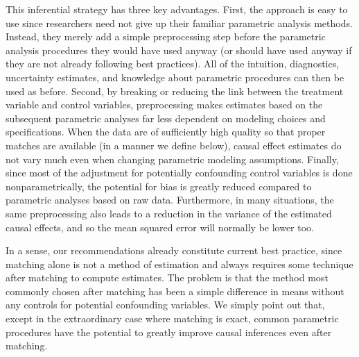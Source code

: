 \documentclass[11pt,titlepage]{article}
\begin{document}
This inferential strategy has three key advantages.  First, the
approach is easy to use since researchers need not give up their
familiar parametric analysis methods.  Instead, they merely add a
simple preprocessing step before the parametric analysis procedures
they would have used anyway (or should have used anyway if they are
not already following best practices).  All of the intuition,
diagnostics, uncertainty estimates, and knowledge about parametric
procedures can then be used as before.  Second, by breaking or
reducing the link between the treatment variable and control
variables, preprocessing makes estimates based on the subsequent
parametric analyses far less dependent on modeling choices and
specifications.  When the data are of sufficiently high quality so
that proper matches are available (in a manner we define below),
causal effect estimates do not vary much even when changing parametric
modeling assumptions.  Finally, since most of the adjustment for
potentially confounding control variables is done nonparametrically,
the potential for bias is greatly reduced compared to parametric
analyses based on raw data.  Furthermore, in many situations, the same
preprocessing also leads to a reduction in the variance of the
estimated causal effects, and so the mean squared error will normally
be lower too.

In a sense, our recommendations already constitute current best
practice, since matching alone is not a method of estimation and
always requires some technique after matching to compute estimates.
The problem is that the method most commonly chosen after matching has
been a simple difference in means without any controls for potential
confounding variables.  We simply point out that, except in the
extraordinary case where matching is exact, common parametric
procedures have the potential to greatly improve causal inferences
even after matching.
\end{document}
